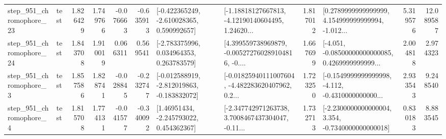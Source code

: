 \begin{tabular}{llrrrrllrlrr}
  step\_951\_chromophore\_23 &      test &      1.826429 &    1.749766 &     -0.076663 & -0.635913 &   [-0.422365249, -2.610028365, 0.590992657] &  [-1.18818127667813, -4.12190140604495, 1.24620... &       1.817012 &  [0.2789999999999999, 4.154999999999994, -1.012... &            5.319576 &         12.089587 \\
  step\_951\_chromophore\_24 &      test &      1.843708 &    1.910019 &      0.066311 &  0.569541 &    [-2.783375996, 0.034964353, 0.263783579] &  [4.399559738969879, -0.005272760289104816, -0.... &       1.667699 &  [-4.051, -0.08500000000000085, 0.4269999999999... &            2.004818 &          2.974323 \\
   step\_951\_chromophore\_3 &      test &      1.857586 &    1.828741 &     -0.028845 & -0.232747 &  [-0.012588919, -2.812019863, -0.183832072] &  [-0.01825940111007604, -4.482283620407962, 0.2... &       1.723250 &  [-0.1549999999999998, -4.112, -0.4310000000000... &            2.933543 &          9.248540 \\
   step\_951\_chromophore\_4 &      test &      1.815708 &    1.774131 &     -0.041577 & -0.340092 &     [1.46951434, -2.245793022, 0.454362367] &  [-2.347742971263738, 3.7008467437304047, -0.11... &       1.732713 &  [-2.2300000000000004, 3.354, -0.7340000000000018] &            0.830183 &          8.883545 \\
\bottomrule
\end{tabular}

